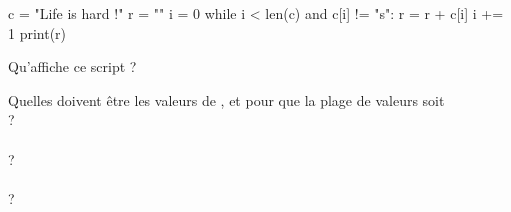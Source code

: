\documentclass[a4paper,12pt]{article}
\begin{document}
\begin{multicols}{2}



\begin{pythoncode}
c = "Life is hard !"
r = ""
i = 0
while i < len(c) and c[i] != "s":
    r = r + c[i]
    i += 1
print(r)
        \end{pythoncode}
    Qu'affiche ce script ?\\

\end{multicols}

Quelles doivent être les valeurs de ,  et  pour que la plage de valeurs  soit\\

 ? \\

\\

 ? \\

\\

 ? \\

\\
\end{document}
